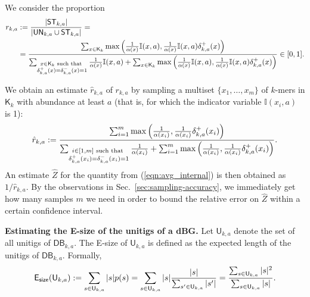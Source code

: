 \documentclass[a4paper,11pt]{article}
\newcommand{\alex}[1]{{\color{blue}{#1}}}
\newcommand{\DB}{\mathsf{DB}_{k,a}}
\newcommand{\U}{\mathsf{U}_{k,a}}
\newcommand{\ST}{\mathsf{ST}_{k,a}}
\newcommand{\UN}{\mathsf{UN}_{k,a}}
\newcommand{\dplus}{\delta^+_{k,a}}
\newcommand{\dminus}{\delta^-_{k,a}}
\newcommand{\K}{\mathsf{K}}
\newcommand{\abu}{\alpha}
\newcommand{\esize}{{\sf E_{size}}}
\begin{document}
We consider the proportion
\begin{align*}
r_{k,a} & := \frac{|\ST|}{|\UN \cup \ST|} = \\ 
& = \frac{\sum_{x \in \K_k} \max\left(\frac{1}{\abu(x)}\mathbb{I}(x,a),\frac{1}{\abu(x)}\mathbb{I}(x,a)\dplus(x)\right)}{\sum_{\begin{subarray}{c} x \in \K_k \text{ such that } \\ \dplus(x) = \dminus(x) = 1 \end{subarray}} \frac{1}{\abu(x)}\mathbb{I}(x,a) + \sum_{x \in \K_k} \max\left(\frac{1}{\abu(x)}\mathbb{I}(x,a),\frac{1}{\abu(x)}\mathbb{I}(x,a)\dplus(x)\right)}\in [0,1].\\
\end{align*}

We obtain an estimate $\hat{r}_{k,a}$ of $r_{k,a}$ by sampling a multiset $\{x_1,\dots,x_m\}$ of $k$-mers in $\K_k$ with abundance at least $a$ (that is, for which the indicator variable $\mathbb{I}(x_i,a)$ is 1):
\[\hat{r}_{k,a} := \frac{\sum_{i=1}^{m} \max\left(\frac{1}{\abu(x_i)},\frac{1}{\abu(x_i)}\dplus(x_i)\right)}{\sum_{\begin{subarray}{c} i \in [1,m] \text{ such that } \\ \dplus(x_i) = \dminus(x_i) = 1 \end{subarray}} \frac{1}{\abu(x_i)} + \sum_{i=1}^{m} \max\left(\frac{1}{\abu(x_i)},\frac{1}{\abu(x_i)}\dplus(x_i)\right)}.\]
An estimate $\hat{Z}$ for the quantity from (\ref{eqn:avg_internal}) is then obtained as $1/\hat{r}_{k,a}$. By the observations in Sec.~\ref{sec:sampling-accuracy}, we immediately get how many samples $m$ we need in order to bound the relative error on $\hat{Z}$ within a certain confidence interval.
\alex{say we can implement this for all abundances.}



\medskip
\noindent\textbf{Estimating the E-size of the unitigs of a dBG.} Let $\U$ denote the set of all unitigs of $\DB$. The E-size of $\U$ is defined as the expected length of the unitigs of $\DB$. Formally, 
\[\esize(\U) := \sum_{s \in \U}|s|p(s) = \sum_{s \in \U} |s|\frac{|s|}{\sum_{s' \in \U}|s'|} = \frac{\sum_{s \in \U}|s|^2}{\sum_{s \in \U}|s|}.\]
\end{document}
